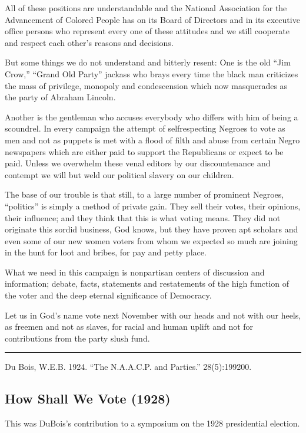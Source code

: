 \documentclass[letterpaper,10pt,english]{jupyterBook}
\begin{document}
\sphinxAtStartPar
All of these positions are understandable and the National Association for the Advancement of Colored People has on its Board of Directors and in its executive office persons who represent every one of these attitudes and we still co\sphinxhyphen{}operate and respect each other’s reasons and decisions.

\sphinxAtStartPar
But some things we do not understand and bitterly resent: One is the old “Jim Crow,” “Grand Old Party” jackass who brays every time the black man criticizes the mass of privilege, monopoly and condescension which now masquerades as the party of Abraham Lincoln.

\sphinxAtStartPar
Another is the gentleman who accuses everybody who differs with him of being a scoundrel. In every campaign the attempt of self\sphinxhyphen{}respecting Negroes to vote as men and not as puppets is met with a flood of filth and abuse from certain Negro newspapers which are either paid to support the Republicans or expect to be paid. Unless we overwhelm these venal editors by our discountenance and contempt we will but weld our political slavery on our children.

\sphinxAtStartPar
The base of our trouble is that still, to a large number of prominent Negroes, “politics” is simply a method of private gain. They sell their votes, their opinions, their influence; and they think that this is what voting means. They did not originate this sordid business, God knows, but they have proven apt scholars and even some of our new women voters from whom we expected so much are joining in the hunt for loot and bribes, for pay and petty place.

\sphinxAtStartPar
What we need in this campaign is non\sphinxhyphen{}partisan centers of discussion and information; debate, facts, statements and re\sphinxhyphen{}statements of the high function of the voter and the deep eternal significance of Democracy.

\sphinxAtStartPar
Let us in God’s name vote next November with our heads and not with our heels, as freemen and not as slaves, for racial and human uplift and not for contributions from the party slush fund.


\bigskip\hrule\bigskip


\sphinxAtStartPar
{} Du Bois, W.E.B. 1924. “The N.A.A.C.P. and Parties.” 28(5):199\sphinxhyphen{}200.


\subsection{How Shall We Vote (1928)}
\label{\detokenize{Volumes/29/01/how_shall_we_vote:how-shall-we-vote-1928}}\label{\detokenize{Volumes/29/01/how_shall_we_vote::doc}}
\begin{sphinxShadowBox}
\sphinxstylesidebartitle{}

\sphinxAtStartPar
This was DuBois’s contribution to a symposium on the 1928 presidential election.
\end{sphinxShadowBox}
\end{document}
